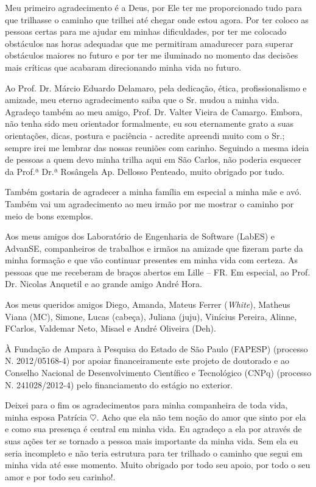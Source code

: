 Meu primeiro agradecimento é a Deus, por Ele ter me proporcionado tudo para que trilhasse o caminho que trilhei até chegar onde estou agora. Por ter coloco as pessoas certas para me ajudar em minhas dificuldades, por ter me colocado obstáculos nas horas adequadas que me permitiram amadurecer para superar obstáculos maiores no futuro e por ter me iluminado no momento das decisões mais críticas que acabaram direcionando minha vida no futuro.

Ao Prof. Dr. Márcio Eduardo Delamaro, pela dedicação, ética, profissionalismo e amizade, meu eterno agradecimento saiba que o Sr. mudou a minha vida. Agradeço também ao meu amigo, Prof. Dr. Valter Vieira de Camargo. Embora, não tenha sido meu orientador formalmente, eu sou eternamente grato a suas orientações, dicas, postura e paciência - acredite apreendi muito com o Sr.; sempre irei me lembrar das nossas reuniões com carinho. Seguindo a mesma ideia de pessoas a quem devo minha trilha aqui em São Carlos, não poderia esquecer da Prof.ª Dr.ª Rosângela Ap. Dellosso Penteado, muito obrigado por tudo.

Também gostaria de agradecer a minha família em especial a minha mãe e avó. Também vai um agradecimento ao meu irmão por me mostrar o caminho por meio de bons exemplos.

Aos meus amigos dos Laboratório de Engenharia de Software (LabES) e AdvanSE, companheiros de trabalhos e irmãos na amizade que fizeram parte da minha formação e que vão continuar presentes em minha vida com certeza. As pessoas que me receberam de braços abertos em Lille – FR. Em especial, ao Prof. Dr. Nicolas Anquetil e ao grande amigo André Hora. 

Aos meus queridos amigos Diego, Amanda, Mateus Ferrer (\textit{White}), Matheus Viana (MC), Simone, Lucas (cabeça), Juliana (juju), Vinícius Pereira, Alinne, FCarlos, Valdemar Neto, Misael e André Oliveira (Deh).

À Fundação de Ampara à Pesquisa do Estado de São Paulo (FAPESP) (processo N. 2012/05168-4) por apoiar financeiramente este projeto de doutorado e ao Conselho Nacional de Desenvolvimento Científico e Tecnológico (CNPq) (processo N. 241028/2012-4) pelo financiamento do estágio no exterior.

Deixei para o fim os agradecimentos para minha companheira de toda vida, minha esposa Patrícia $\heartsuit$. Acho que ela não tem noção do amor que sinto por ela e como sua presença é central em minha vida. Eu agradeço a ela por através de suas ações ter se tornado a pessoa mais importante da minha vida. Sem ela eu seria incompleto e não teria estrutura para ter trilhado o caminho que segui em minha vida até esse momento. Muito obrigado por todo seu apoio, por todo o seu amor e por todo seu carinho!.

